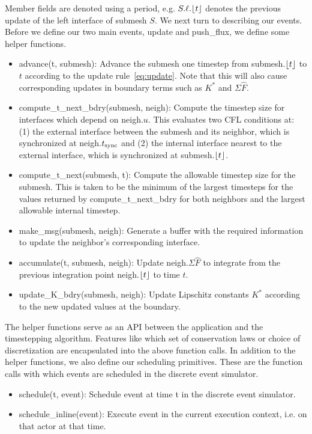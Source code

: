 Member fields are denoted using a period, e.g. $S.\ell.\lfloor t \rfloor$ denotes the previous update of the left interface of submesh $S$.
We next turn to describing our events. Before we define our two main events, {\sc update} and {\sc push\_flux}, we define some helper functions.
\begin{definition}
\label{def:helper-functions}
\begin{itemize}
\item {\sc advance(t, submesh)}: Advance the submesh one timestep from submesh.$\lfloor t \rfloor$ to $t$ according to the update rule~\eqref{eq:update}. Note that this will also cause corresponding updates in boundary terms such as $K^*$ and $\Sigma \hat{F}$.
\item {\sc compute\_t\_next\_bdry(submesh, neigh)}: Compute the timestep size for interfaces which depend on neigh.$u$. This evaluates two CFL conditions at: (1) the external interface between the submesh and its neighbor, which is synchronized at neigh.$t_{\text{sync}}$ and (2) the internal interface nearest to the external interface, which is synchronized at submesh.$\lfloor t \rfloor$.
\item {\sc compute\_t\_next(submesh, t)}: Compute the allowable timestep size for the submesh. This is taken to be the minimum of the largest timesteps for the values returned by {\sc compute\_t\_next\_bdry} for both neighbors and the largest allowable internal timestep.
\item {\sc make\_msg(submesh, neigh)}: Generate a buffer with the required information to update the neighbor's corresponding interface.
\item {\sc accumulate(t, submesh, neigh)}: Update neigh.$\Sigma \hat{F}$ to integrate from the previous integration point neigh.$\lfloor t \rfloor$ to time $t$. 
\item {\sc update\_K\_bdry(submesh, neigh)}: Update Lipschitz constants $K^*$ according to the new updated values at the boundary.
\end{itemize}
\end{definition}
The helper functions serve as an API between the application and the timestepping algorithm. Features like which set of conservation laws or choice of discretization are encapsulated into the above function calls. In addition to the helper functions, we also define our scheduling primitives. These are the function calls with which events are scheduled in the discrete event simulator.

\begin{definition}
\label{def:scheduling-primitives}
\begin{itemize}
\item {\sc schedule(t, event)}: Schedule {\sc event} at time {\sc t} in the discrete event simulator.
\item {\sc schedule\_inline(event)}: Execute {\sc event} in the current execution context, i.e. on that actor at that time.
\end{itemize}
\end{definition}

